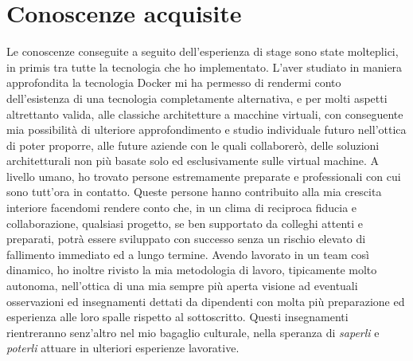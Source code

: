 \section{Conoscenze acquisite}
Le conoscenze conseguite a seguito dell'esperienza di stage sono state molteplici, in primis tra tutte la tecnologia che ho implementato. L'aver studiato in maniera approfondita la tecnologia Docker mi ha permesso di rendermi conto dell'esistenza di una tecnologia completamente alternativa, e per molti aspetti altrettanto valida, alle classiche architetture a macchine virtuali, con conseguente mia possibilità di ulteriore approfondimento e studio individuale futuro nell'ottica di poter proporre, alle future aziende con le quali collaborerò, delle soluzioni architetturali non più basate solo ed esclusivamente sulle virtual machine.
A livello umano, ho trovato persone estremamente preparate e professionali con cui sono tutt'ora in contatto. Queste persone hanno contribuito alla mia crescita interiore facendomi rendere conto che, in un clima di reciproca fiducia e collaborazione, qualsiasi progetto, se ben supportato da colleghi attenti e preparati, potrà essere sviluppato con successo senza un rischio elevato di fallimento immediato ed a lungo termine. Avendo lavorato in un team così dinamico, ho inoltre rivisto la mia metodologia di lavoro, tipicamente molto autonoma, nell'ottica di una mia sempre più aperta visione ad eventuali osservazioni ed insegnamenti dettati da dipendenti con molta più preparazione ed esperienza alle loro spalle rispetto al sottoscritto. Questi insegnamenti rientreranno senz'altro nel mio bagaglio culturale, nella speranza di \textit{saperli} e \textit{poterli} attuare in ulteriori esperienze lavorative.

